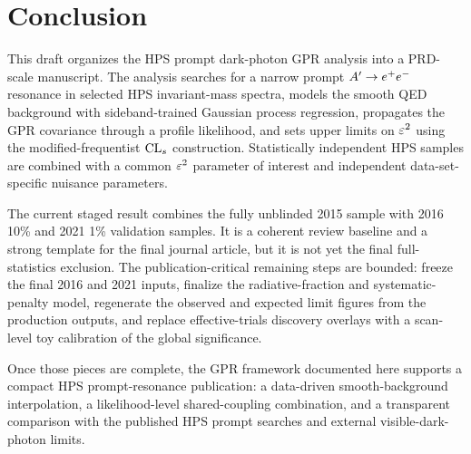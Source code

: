\section{Conclusion}
\label{sec:conclusion}

This draft organizes the HPS prompt dark-photon GPR analysis into a PRD-scale
manuscript. The analysis searches for a narrow prompt $A^{\prime}\to e^+e^-$ resonance in
selected HPS invariant-mass spectra, models the smooth QED background with
sideband-trained Gaussian process regression, propagates the GPR covariance through a
profile likelihood, and sets upper limits on $\varepsilon^2$ using the modified-frequentist
$\mathrm{CL}_{s}$ construction. Statistically independent HPS samples are combined with a common
$\varepsilon^2$ parameter of interest and independent data-set-specific nuisance parameters.

The current staged result combines the fully unblinded 2015 sample with 2016 10\% and
2021 1\% validation samples. It is a coherent review baseline and a strong template
for the final journal article, but it is not yet the final full-statistics exclusion.
The publication-critical remaining steps are bounded: freeze the final 2016 and 2021
inputs, finalize the radiative-fraction and systematic-penalty model, regenerate the
observed and expected limit figures from the production outputs, and replace
effective-trials discovery overlays with a scan-level toy calibration of the global
significance.

Once those pieces are complete, the GPR framework documented here supports a compact
HPS prompt-resonance publication: a data-driven smooth-background interpolation, a
likelihood-level shared-coupling combination, and a transparent comparison with the
published HPS prompt searches and external visible-dark-photon limits.
